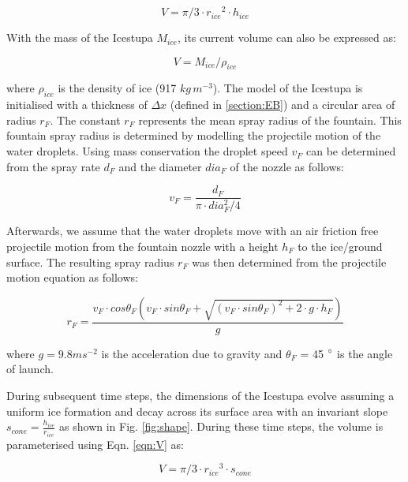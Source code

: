 \documentclass[utf8]{frontiersSCNS} %
\begin{document}
\begin{equation} V = \pi/3 \cdot {r_{ice}}^2 \cdot h_{ice} \label{eqn:V} \end{equation}

With the mass of the Icestupa $M_{ice}$, its current volume can also be expressed as:

\begin{equation} V = M_{ice} / \rho_{ice} \label{eqn:V1} \end{equation}

where $\rho_{ice}$ is the density of ice (917 $kg\, m^{-3}$). The model of the Icestupa is initialised with a
thickness of $\Delta x$ (defined in \ref{section:EB}) and a circular area of radius $r_F$. The constant $r_F$
represents the mean spray radius of the fountain.  This fountain spray radius is determined by modelling the
projectile motion of the water droplets. Using mass conservation the droplet speed $v_F$ can be determined from the
spray rate $d_F$ and the diameter $dia_F$ of the nozzle as follows:

\begin{equation} v_F = \frac{d_F}{\pi \cdot dia_F^2/4} \end{equation}

Afterwards, we assume that the water droplets move with an air friction free projectile motion from the fountain
nozzle with a height $h_F$ to the ice/ground surface. The resulting spray radius $r_F$ was then determined from the
projectile motion equation as follows:

\begin{equation} r_F = \frac{v_F \cdot cos\theta_F (v_F \cdot sin\theta_F + \sqrt{(v_F \cdot sin\theta_F)^{2} + 2
\cdot g \cdot h_F})}{g} \end{equation}

where $g = 9.8 m s^{-2}$ is the acceleration due to gravity and $\theta_F$ = 45 $\degree$ is the angle of launch.

During subsequent time steps, the dimensions of the Icestupa evolve assuming a uniform ice formation and decay across
its surface area with an invariant slope $s_{cone} = \frac{h_{ice}}{r_{ice}}$ as shown in Fig.  \ref{fig:shape}.
During these time steps, the volume is parameterised using Eqn. \ref{eqn:V} as:

\begin{equation} V = \pi/3 \cdot {r_{ice}}^3 \cdot s_{cone} \label{eqn:V2} \end{equation}
\end{document}
